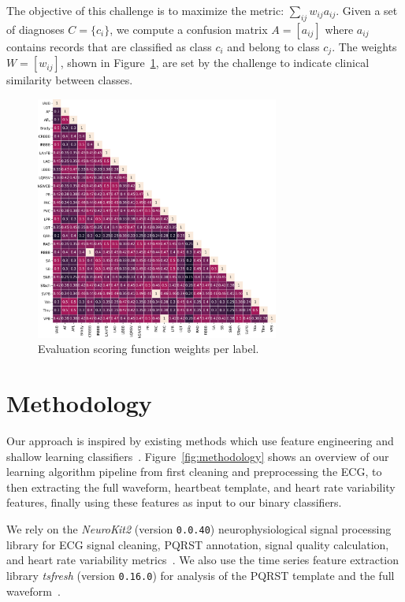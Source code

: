 \documentclass[twocolumn]{cinc}
\begin{document}
The objective of this challenge is to maximize the metric: $\sum_{ij} w_{ij} a_{ij}$.
Given a set of diagnoses $C = \{c_i\}$, we compute a confusion matrix $A = [a_{ij}]$ where $a_{ij}$ contains records that are classified as class $c_i$ and belong to class $c_j$.
The weights $W = [w_{ij}]$, shown in Figure~\ref{fig:dataset_labeldx}, are set by the challenge to indicate clinical similarity between classes.

\begin{figure}[ht]
  \centering
  \includegraphics[width=8cm]{fig/label_weights.png}
  \caption{Evaluation scoring function weights per label.}
  \label{fig:dataset_labeldx}
\end{figure}

\section{Methodology}

Our approach is inspired by existing methods which use feature engineering and shallow learning classifiers~\cite{goodwin_classification_2017}.
Figure~\ref{fig:methodology} shows an overview of our learning algorithm pipeline from first cleaning and preprocessing the ECG, to then extracting the full waveform, heartbeat template, and heart rate variability features, finally using these features as input to our binary classifiers.

We rely on the \emph{NeuroKit2} (version \texttt{0.0.40}) neurophysiological signal processing library for ECG signal cleaning, PQRST annotation, signal quality calculation, and heart rate variability metrics~\cite{neurokit2}.
We also use the time series feature extraction library \emph{tsfresh} (version \texttt{0.16.0}) for analysis of the PQRST template and the full waveform~\cite{CHRIST201872}.
\end{document}
